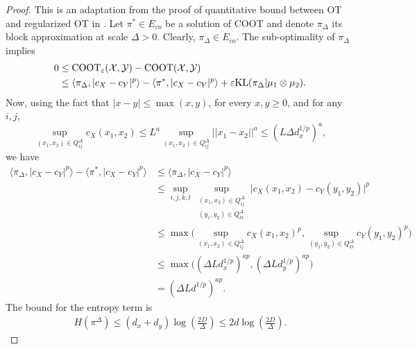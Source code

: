 \begin{proof}
    This is an adaptation from the proof of quantitative bound between OT and regularized OT
    in \citep{Genevay19}.
    Let $\pi^* \in E_{co}$ be a solution of COOT and denote $\pi_{\Delta}$
    its block approximation at scale $\Delta > 0$.
    Clearly, $\pi_{\Delta} \in E_{co}$. The sub-optimality of $\pi_{\Delta}$ implies
    \begin{equation}
      \begin{split}
        0 &\leq \text{COOT}_{\varepsilon}(\mathcal X, \mathcal Y) - \text{COOT}(\mathcal X, \mathcal Y) \\
        &\leq \langle \pi_{\Delta}, \vert c_X - c_Y \vert^p \rangle
        - \langle \pi^*, \vert c_X - c_Y \vert^p \rangle +
        \varepsilon \text{KL}(\pi_{\Delta} \vert \mu_1 \otimes \mu_2).
      \end{split}
    \end{equation}
    Now, using the fact that $\vert x - y \vert \leq \max(x,y)$, for every $x, y \geq 0$,
    and for any $i,j$,
    \begin{equation}
      \sup_{(x_1, x_2) \in Q^{\Delta}_{ij}} c_X(x_1,x_2) \leq
      L^a \sup_{(x_1, x_2) \in Q^{\Delta}_{ij}} \vert\vert x_1 - x_2 \vert\vert^a \leq (L \Delta d_x^{1/p})^a,
    \end{equation}
    we have
    \begin{equation}
      \begin{split}
        \langle \pi_{\Delta}, \vert c_X - c_Y \vert^p \rangle
        - \langle \pi^*, \vert c_X - c_Y \vert^p \rangle
        &\leq \langle \pi_{\Delta}, \vert c_X - c_Y \vert^p \rangle \\
        &\leq \sup_{i,j,k,l} \sup_{\substack{(x_1, x_2) \in Q^{\Delta}_{ij} \\ (y_1,y_2) \in Q^{\Delta}_{kl}}}
        \vert c_X(x_1,x_2) - c_Y(y_1,y_2) \vert^p \\
        &\leq \max\big( \sup_{(x_1, x_2) \in Q^{\Delta}_{ij}} c_X(x_1,x_2)^p,
        \sup_{(y_1, y_2) \in Q^{\Delta}_{kl}} c_Y(y_1,y_2)^p \big) \\
        &\leq \max\big( (\Delta Ld_x^{1/p})^{ap}, (\Delta Ld_y^{1/p})^{ap} \big) \\
        &= (\Delta Ld^{1/p})^{ap}.
      \end{split}
    \end{equation}
    The bound for the entropy term is
    \begin{equation}
      \begin{split}
        H(\pi^{\Delta}) \leq (d_x + d_y) \log(\frac{2D}{\Delta}) \leq 2 d \log(\frac{2D}{\Delta}).

\end{split}
\end{equation}
\end{proof}
